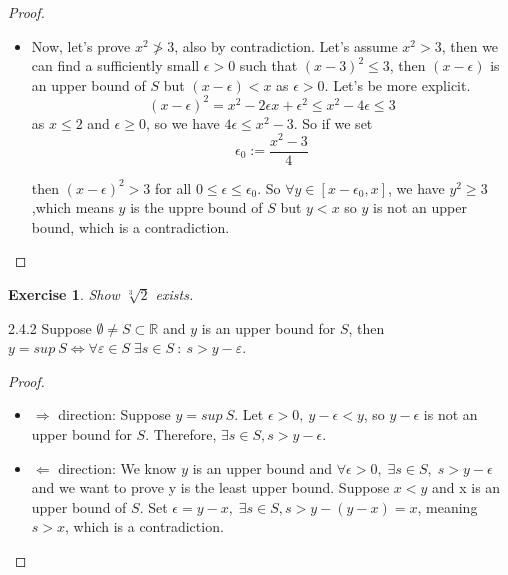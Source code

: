 \documentclass[a4paper]{article}
\newtheorem{exercise}{Exercise}[subsection]
\begin{document}
\begin{proof}
\begin{itemize}
    \item Now, let's prove $x^2 \ngtr 3$, also by contradiction. Let's assume $x^2>3$, then we can find a sufficiently small $\epsilon >0$ such that $(x-3)^2\leq 3$, then $(x-\epsilon )$ is an upper bound of $S$ but $(x-\epsilon)<x$ as $\epsilon >0$. Let's be more explicit.
        \begin{equation*}
            (x-\epsilon )^2=x^2-2\epsilon x+{\epsilon }^2\leq x^2-4\epsilon \leq 3
        \end{equation*}
        as $x \leq 2$ and $\epsilon \geq 0$, so we have $4\epsilon \leq x^2-3$. So if we set
        \begin{equation*}
            \epsilon_0:=\frac{x^2-3}{4} 
        \end{equation*}
        
        then $(x-\epsilon )^2>3$ for all $0\leq \epsilon \leq \epsilon_0$. So $ \forall y\in [x-\epsilon_0,x]$, we have $y^2\geq 3$,which means $y$ is the uppre bound of $S$ but $y<x$ so $y$ is not an upper bound, which is a contradiction. 
    \end{itemize}
    \end{proof}
    \begin{exercise}
        Show $\sqrt[3]{2}$ exists.
    \end{exercise}
\begin{proposition}{2.4.2}
    Suppose $\emptyset \neq S\subset \mathbb{R}$ and $y$ is an upper bound for $S$, then $y=sup\: S\Longleftrightarrow  \forall\varepsilon \in S \; \exists s\in S  \: : \: s>y-\varepsilon $.  
\end{proposition}
\begin{proof}
    \begin{itemize}
    \item $\Longrightarrow$ direction: Suppose $y=sup\:S$. Let $\epsilon >0, \: y-\epsilon<y$, so $y-\epsilon$ is not an upper bound for $S$. Therefore, $\exists s\in S, s>y-\epsilon$.
    \item $\Longleftarrow $ direction: We know $y$ is an upper bound and $\forall \epsilon >0,\; \exists s\in S,\; s>y-\epsilon$ and we want to prove y is the least upper bound. Suppose $x<y$ and x is an upper bound of $S$. Set $\epsilon=y-x,\; \exists s\in S, s>y-(y-x)=x$, meaning $s>x$, which is a contradiction.
    \end{itemize}
\end{proof}
\end{document}
